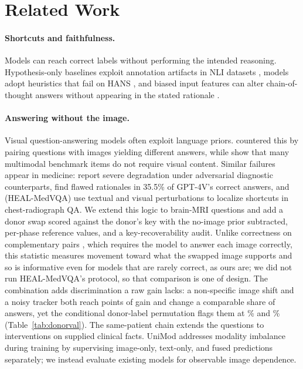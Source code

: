 \documentclass[11pt]{article}
\begin{document}
\section{Related Work}
\label{sec:related-work}

\paragraph{Shortcuts and faithfulness.} Models can reach correct labels without performing the intended reasoning. Hypothesis-only baselines exploit annotation artifacts in NLI datasets \citep{poliak2018hypothesis,gururangan2018annotation}, models adopt heuristics that fail on HANS \citep{mccoy2019right}, and biased input features can alter chain-of-thought answers without appearing in the stated rationale \citep{turpin2023language}.

\paragraph{Answering without the image.} Visual question-answering models often exploit language priors. \citet{goyal2017making} countered this by pairing questions with images yielding different answers, while \citet{chen2024right} show that many multimodal benchmark items do not require visual content. Similar failures appear in medicine: \citet{yan2025worse} report severe degradation under adversarial diagnostic counterparts, \citet{jin2024hidden} find flawed rationales in 35.5\% of GPT-4V's correct answers, and \citet{nguyen2025localizing} (HEAL-MedVQA) use textual and visual perturbations to localize shortcuts in chest-radiograph QA. We extend this logic to brain-MRI questions and add a donor swap scored against the donor's key with the no-image prior subtracted, per-phase reference values, and a key-recoverability audit. Unlike correctness on complementary pairs \citep{goyal2017making}, which requires the model to answer each image correctly, this statistic measures movement toward what the swapped image supports and so is informative even for models that are rarely correct, as ours are; we did not run HEAL-MedVQA's protocol, so that comparison is one of design. The combination adds discrimination a raw gain lacks: a non-specific image shift and a noisy tracker both reach \vfourDonorValShiftGain{} points of gain and change a comparable share of answers, yet the conditional donor-label permutation flags them at \vfourDonorValShiftDetect{}\% and \vfourDonorValTrackLowDetect{}\% (Table~\ref{tab:donorval}). The same-patient chain extends the questions to interventions on supplied clinical facts. UniMod \citep{gu2026unimod} addresses modality imbalance during training by supervising image-only, text-only, and fused predictions separately; we instead evaluate existing models for observable image dependence.
\end{document}
